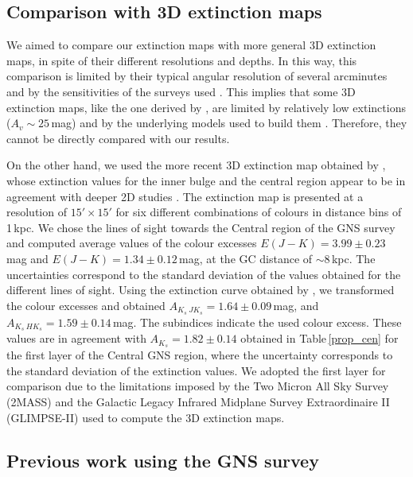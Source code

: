 \documentclass{aa}
\begin{document}
\subsection{Comparison with 3D extinction maps}

We aimed to compare our extinction maps with more general 3D extinction maps, in spite of their different resolutions and depths. In this way, this comparison is limited by their typical angular resolution of several arcminutes and by the sensitivities of the surveys used  \citep[see Sect. 1 in][]{Schultheis:2009tg}. This implies that some 3D extinction maps, like the one derived by \citet{Marshall:2006ty}, are limited by relatively low extinctions ($A_v\sim25$\,mag) and by the underlying models used to build them \citep[e.g.][]{Drimmel:2003vv}. Therefore, they cannot be directly compared with our results. 

On the other hand, we used the more recent 3D extinction map obtained by \citet{Chen:2013vm}, whose extinction values for the inner bulge and the central region appear to be in agreement with deeper 2D studies \citep[see Sect. 5.3 in][]{Chen:2013vm}. The extinction map is presented at a resolution of $15'\times15'$ for six different combinations of colours in distance bins of 1\,kpc. We chose the lines of sight towards the Central region of the GNS survey and computed average values of the colour excesses $E(J-K)=3.99\pm0.23$\,mag and $E(J-K)=1.34\pm0.12$\,mag, at the GC distance of $\sim8$\,kpc. The uncertainties correspond to the standard deviation of the values obtained for the different lines of sight. Using the extinction curve obtained by \citet{Nogueras-Lara:2020aa}, we transformed the colour excesses and obtained $A_{K_s\ JK_s} = 1.64\pm0.09$\,mag, and $A_{K_s\ HK_s} = 1.59\pm0.14$\,mag. The subindices indicate the used colour excess. These values are in agreement with $A_{K_s}=1.82\pm0.14$ obtained in Table\,\ref{prop_cen} for the first layer of the Central GNS region, where the uncertainty corresponds to the standard deviation of the extinction values. We adopted the first layer for comparison due to the limitations imposed by the Two Micron All Sky Survey (2MASS) and the Galactic Legacy Infrared Midplane Survey Extraordinaire II (GLIMPSE-II) used to compute the 3D extinction maps.










\subsection{Previous work using the GNS survey}
    
\end{document}
